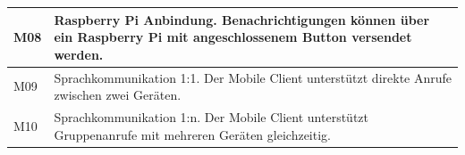 \begin{table}[h]
\begin{tabular}{|l|p{15cm}|}
        \hline
        M08         & Raspberry Pi Anbindung. Benachrichtigungen können über ein Raspberry Pi mit angeschlossenem Button versendet werden. \\
        \hline
        M09         & Sprachkommunikation 1:1. Der Mobile Client unterstützt direkte Anrufe zwischen zwei Geräten. \\
        \hline
        M10         & Sprachkommunikation 1:n. Der Mobile Client unterstützt Gruppenanrufe mit mehreren Geräten gleichzeitig. \\
        \hline
    \end{tabular}\label{tab:milestones}
\end{table}
\clearpage



